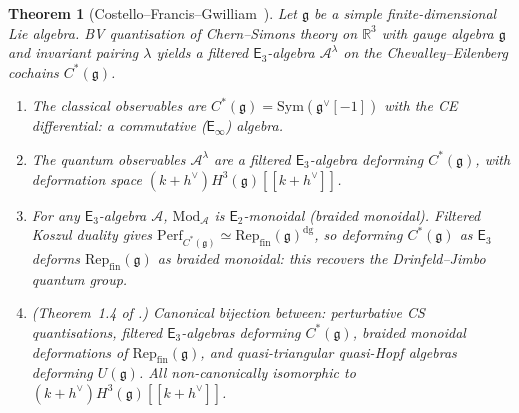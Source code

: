 \documentclass[11pt,reqno]{amsart}
\newtheorem{theorem}{Theorem}[section]
\theoremstyle{definition}
\theoremstyle{remark}
\newcommand{\cA}{\mathcal{A}}
\newcommand{\Etwo}{\mathsf{E}_{2}}
\newcommand{\Ethree}{\mathsf{E}_{3}}
\newcommand{\Einf}{\mathsf{E}_{\infty}}
\newcommand{\Sym}{\mathrm{Sym}}
\newcommand{\fg}{\mathfrak{g}}
\newcommand{\RR}{\mathbb{R}}
\numberwithin{equation}{section}
\begin{document}
\begin{theorem}[Costello--Francis--Gwilliam~\cite{CFG26}]
\label{thm:cfg}
Let $\fg$ be a simple finite-dimensional Lie algebra.
BV quantisation of Chern--Simons theory on $\RR^3$ with
gauge algebra $\fg$ and invariant pairing $\lambda$ yields
a filtered $\Ethree$-algebra $\cA^\lambda$ on the
Chevalley--Eilenberg cochains $C^*(\fg)$.
\begin{enumerate}[label=\textup{(\roman*)}]
\item The classical observables are
  $C^*(\fg) = \Sym(\fg^\vee[-1])$
  with the CE differential: a commutative
  \textup{(}$\Einf$\textup{)} algebra.
\item The quantum observables
  $\cA^\lambda$ are a filtered $\Ethree$-algebra deforming
  $C^*(\fg)$, with deformation space
  $(k+h^\vee) H^3(\fg)[[k+h^\vee]]$.
\item For any $\Ethree$-algebra $\cA$,
  $\mathrm{Mod}_\cA$ is $\Etwo$-monoidal \textup{(}braided
  monoidal\textup{)}. Filtered Koszul duality gives
  $\mathrm{Perf}_{C^*(\fg)}
  \simeq \mathrm{Rep}_{\mathrm{fin}}(\fg)^{\mathrm{dg}}$,
  so deforming $C^*(\fg)$ as $\Ethree$ deforms
  $\mathrm{Rep}_{\mathrm{fin}}(\fg)$ as braided monoidal:
  this recovers the Drinfeld--Jimbo quantum group.
\item \textup{(Theorem~1.4 of \cite{CFG26}.)} Canonical
  bijection between: perturbative CS quantisations, filtered
  $\Ethree$-algebras deforming $C^*(\fg)$, braided monoidal
  deformations of $\mathrm{Rep}_{\mathrm{fin}}(\fg)$, and
  quasi-triangular quasi-Hopf algebras deforming $U(\fg)$.
  All non-canonically isomorphic to
  $(k+h^\vee) H^3(\fg)[[k+h^\vee]]$.
\end{enumerate}
\end{theorem}
\end{document}
